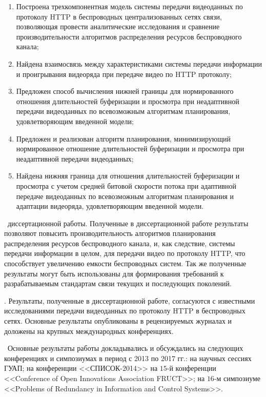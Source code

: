\novelty
\begin{enumerate}
    \item Построена трехкомпонентная модель системы передачи видеоданных по протоколу HTTP в беспроводных централизованных сетях связи, позволяющая провести аналитические исследования и сравнение производительности алгоритмов распределения ресурсов беспроводного канала;
    \item Найдена взаимосвязь между характеристиками системы передачи информации и проигрывания видеоряда при передаче видео по HTTP протоколу;
    \item Предложен способ вычисления нижней границы для нормированного отношения длительностей буферизации и просмотра при неадаптивной передачи видеоданных по всевозможным алгоритмам планирования, удовлетворяющим введенной модели;
    \item Предложен и реализован алгоритм планирования, минимизирующий нормированное отношение длительностей буферизации и просмотра при неадаптивной передачи видеоданных;
    \item Найдена нижняя граница для отношения длительностей буферизации и просмотра с учетом средней битовой скорости потока при адаптивной передаче видеоданных по всевозможным алгоритмам планирования и адаптации видеоряда, удовлетворяющим введенной модели.
\end{enumerate}

\influence\ диссертационной работы. Полученные в диссертационной работе результаты позволяют повысить производительность алгоритмов планирования распределения ресурсов беспроводного канала, и, как следствие, системы передачи информации в целом, для передачи видео по протоколу HTTP, что способствует увеличению емкости беспроводных систем. Так же полученные результаты могут быть использованы для формирования требований к разрабатываемым стандартам связи текущих и последующих поколений.

\reliability. Результаты, полученные в диссертационной работе, согласуются с известными исследованиями передачи видеоданных по протоколу HTTP в беспроводных сетях. Основные результаты опубликованы в рецензируемых журналах и доложены на крупных международных конференциях.

\probation\ Основные результаты работы докладывались и обсуждались на следующих конференциях и симпозиумах в период с 2013 по 2017 гг.: на научных сессиях ГУАП; на конференции <<СПИСОК-2014>> на $15$-й конференции <<Conference of Open Innovations Association FRUCT>>; на $16$-м симпозиуме <<Problems of Redundancy in Information and Control Systems>>.

